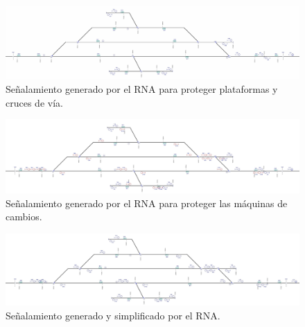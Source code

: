     \begin{figure}[h]
        \centering
        \includegraphics[width=1\textwidth]{resultados-obtenidos/ejemplo4/images/4_step3.png}
        \centering\caption{Señalamiento generado por el RNA para proteger plataformas y cruces de vía.}
    \end{figure}

    \begin{figure}[h]
        \centering
        \includegraphics[width=1\textwidth]{resultados-obtenidos/ejemplo4/images/4_step4.png}
        \centering\caption{Señalamiento generado por el RNA para proteger las máquinas de cambios.}
    \end{figure}

    \begin{figure}[h]
        \centering
        \includegraphics[width=1\textwidth]{resultados-obtenidos/ejemplo4/images/4_RNA.png}
        \centering\caption{Señalamiento generado y simplificado por el RNA.}
    \end{figure}

    
    
    
    